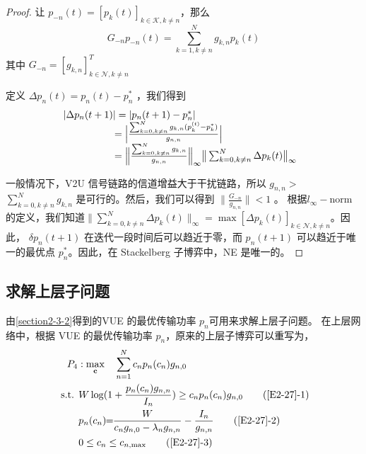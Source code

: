 \begin{proof}
让 $p_{-n}(t)=[p_k(t)]_{k\in\mathcal{K},k\neq n}$，那么
\begin{equation} \label{E2-25}
G_{-n}p_{-n}(t)=\sum\limits_{k=1,k\neq n}^N g_{k,n}p_k(t)
\end{equation}
其中 $G_{-n}=[g_{k,n}]_{k\in\mathcal{N},k\neq n}^T$ \par
定义 $\Delta p_{n}(t)=p_{n}(t)-p_{n}^*$ ，我们得到
\begin{eqnarray}\label{E2-26}
\hspace{-0.2cm}
 \begin{array}{lll}
&\!\!\!\!\!\!\!|\Delta p_{n}(t+1)|=|p_{n}(t+1)-p_{n}^*|\\
&\quad \quad \quad \quad =\Big|\frac{\sum_{k=0,k\neq n}^N g_{k,n}(p_k^{(t)}-p_k^*)}{g_{n,n}}\Big|\\
&\quad \quad \quad \quad =\Big\|\frac{\sum_{k=0,k\neq n}^Ng_{k,n}}{g_{n,n}}\Big\|_\infty \big\|\sum_{k=0,k\neq n}^N\Delta p_{k}(t)\big\|_\infty
\end{array}
\end{eqnarray}

一般情况下，V2U 信号链路的信道增益大于干扰链路，所以 $g_{n,n}$$>$$\sum_{k=0,k\neq n}^N g_{k,n}$ 是可行的。然后，我们可以得到 $\|\frac{G_{-n}}{g_{n,n}}\|$$<$$1$ 。
根据$l_\infty-$norm的定义，我们知道$\big\|\sum_{k=0,k\neq n}^N\Delta p_{k}(t)\big\|_\infty$$=$$\max [\Delta p_{k}(t)]_{k\in\mathcal{N},k\neq n}$。因此，
$\delta p_{n}(t+1)$ 在迭代一段时间后可以趋近于零，而 $p_{n}(t+1)$ 可以趋近于唯一的最优点 $p_{n}^*$。因此，在 Stackelberg 子博弈中，NE 是唯一的。
\end{proof}
\subsection{求解上层子问题}\label{section2-3-3}
由\ref{section2-3-2}得到的VUE 的最优传输功率 $p_n$可用来求解上层子问题。
在上层网络中，根据 VUE 的最优传输功率 $p_n$，原来的上层子博弈可以重写为，
\begin{align}
& \!\!\!\!\!\!\!P_4:\max\limits_{\mathbf{c}} \quad \sum\limits_{n=1}^N c_{n} p_n(c_{n}) g_{n,0}                   \label{E2-27}  \\
\text { s.t. }
& W\log(1+\frac{p_{n}(c_{n}) g_{n,n}}{I_n}) \geq c_{n} p_n(c_{n}) g_{n,0}         \tag{\ref{E2-27}{-1}} \label{E2-27-1}\\  %
& p_n(c_{n})\!\!=\!\!\frac{W}{c_n g_{n,0}-\lambda_n g_{n,n}}-\frac{I_n}{g_{n,n}}  \tag{\ref{E2-27}{-2}} \label{E2-27-2}\\ %
& 0\leq c_n\leq c_{n,\textrm{max}}                                                \tag{\ref{E2-27}{-3}} \label{E2-27-3}
\end{align}

